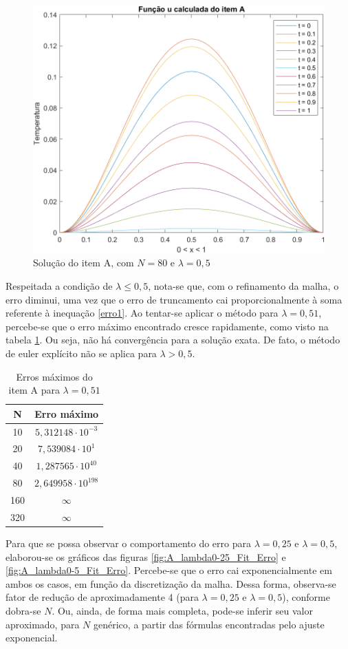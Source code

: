 \documentclass[12pt]{article}
\begin{document}
\begin{spacing}{1.5}
\newpage
\begin{figure}[ht!]
    \centering
    \includegraphics[width=0.5\linewidth]{Primeira_Tarefa/ItemA/itemA_2D.png}
    \caption{Solução do item A, com $N=80$ e $\lambda=0,5$}
    \label{fig:itemA_2D}
\end{figure}

Respeitada a condição de $\lambda \leq 0,5$, nota-se que, com o refinamento da malha, o erro diminui, uma vez que o erro de truncamento cai proporcionalmente à soma referente à inequação \eqref{erro1}. Ao tentar-se aplicar o método para $\lambda = 0,51$, percebe-se que o erro máximo encontrado cresce rapidamente, como visto na tabela \ref{table:A_erro_lambda0-51}. Ou seja, não há convergência para a solução exata. De fato, o método de euler explícito não se aplica para $\lambda > 0,5$.

\begin{table}[ht]
\centering 
\begin{tabular}{c c} 
\hline\hline 
\rule{0pt}{3ex} 
N & Erro máximo\\ [0.5ex] 
\hline 
\rule{0pt}{4ex}
        10  & $5,312148 \cdot 10^{-3}$  \\ 
        20  & $7,539084 \cdot 10^{1}$   \\ 
        40  & $1,287565 \cdot 10^{40}$  \\ 
        80  & $2,649958 \cdot 10^{198}$ \\ 
        160 & $\infty$                  \\ 
        320 & $\infty$                  \\ [1ex]
\hline
\end{tabular}
\caption{Erros máximos do item A para $\lambda = 0,51$} 
\label{table:A_erro_lambda0-51}
\end{table}

Para que se possa observar o comportamento do erro para $\lambda = 0,25$ e $\lambda = 0,5$, elaborou-se os gráficos das figuras \ref{fig:A_lambda0-25_Fit_Erro} e \ref{fig:A_lambda0-5_Fit_Erro}. Percebe-se que o erro cai exponencialmente em ambos os casos, em função da discretização da malha. Dessa forma, observa-se fator de redução de aproximadamente 4 (para $\lambda = 0,25$ e $\lambda = 0,5$), conforme dobra-se $N$. Ou, ainda, de forma mais completa, pode-se inferir seu valor aproximado, para $N$ genérico, a partir das fórmulas encontradas pelo ajuste exponencial.  


\end{spacing}
\end{document}
